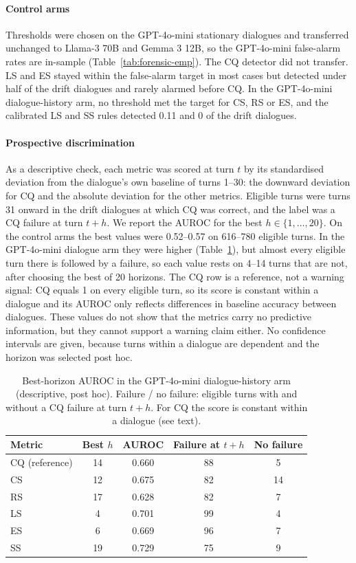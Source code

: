 \documentclass[10pt]{article}
\begin{document}
\paragraph{Control arms}
Thresholds were chosen on the GPT-4o-mini stationary dialogues and transferred
unchanged to Llama-3 70B and Gemma 3 12B, so the GPT-4o-mini false-alarm rates
are in-sample (Table~\ref{tab:forensic-emp}). The CQ detector did not transfer.
LS and ES stayed within the false-alarm target in most cases but detected under
half of the drift dialogues and rarely alarmed before CQ. In the GPT-4o-mini
dialogue-history arm, no threshold met the target for CS, RS or ES, and the
calibrated LS and SS rules detected 0.11 and 0 of the drift dialogues.

\paragraph{Prospective discrimination}
As a descriptive check, each metric was scored at turn $t$ by its standardised
deviation from the dialogue's own baseline of turns 1--30: the downward
deviation for CQ and the absolute deviation for the other metrics. Eligible
turns were turns 31 onward in the drift dialogues at which CQ was correct, and
the label was a CQ failure at turn $t+h$. We report the AUROC for the best
$h\in\{1,\dots,20\}$. On the control arms the best values were 0.52--0.57 on
616--780 eligible turns. In the GPT-4o-mini dialogue arm they were higher
(Table~\ref{tab:auc}), but almost every eligible turn there is followed by a
failure, so each value rests on 4--14 turns that are not, after choosing the
best of 20 horizons. The CQ row is a reference, not a warning signal: CQ equals
1 on every eligible turn, so its score is constant within a dialogue and its
AUROC only reflects differences in baseline accuracy between dialogues. These
values do not show that the metrics carry no predictive information, but they
cannot support a warning claim either. No confidence intervals are given,
because turns within a dialogue are dependent and the horizon was selected
post hoc.

\begin{table}[h]\centering\small
\caption{Best-horizon AUROC in the GPT-4o-mini dialogue-history arm
(descriptive, post hoc). Failure / no failure: eligible turns with and without
a CQ failure at turn $t+h$. For CQ the score is constant within a dialogue
(see text).}
\label{tab:auc}
\begin{tabular}{lcccc}\toprule
Metric & Best $h$ & AUROC & Failure at $t+h$ & No failure\\\midrule
CQ (reference) & 14 & 0.660 & 88 & 5\\
CS & 12 & 0.675 & 82 & 14\\
RS & 17 & 0.628 & 82 & 7\\
LS & 4 & 0.701 & 99 & 4\\
ES & 6 & 0.669 & 96 & 7\\
SS & 19 & 0.729 & 75 & 9\\
\bottomrule\end{tabular}\end{table}
\end{document}

